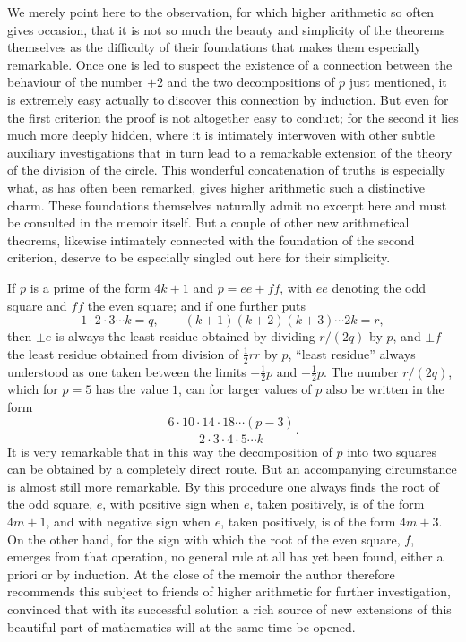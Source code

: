 \documentclass[12pt]{article}
\begin{document}
We merely point here to the observation, for which higher arithmetic so often gives occasion, that it is not so much the beauty and simplicity of the theorems themselves as the difficulty of their foundations that makes them especially remarkable. Once one is led to suspect the existence of a connection between the behaviour of the number $+2$ and the two decompositions of $p$ just mentioned, it is extremely easy actually to discover this connection by induction. But even for the first criterion the proof is not altogether easy to conduct; for the second it lies much more deeply hidden, where it is intimately interwoven with other subtle auxiliary investigations that in turn lead to a remarkable extension of the theory of the division of the circle. This wonderful concatenation of truths is especially what, as has often been remarked, gives higher arithmetic such a distinctive charm. These foundations themselves naturally admit no excerpt here and must be consulted in the memoir itself. But a couple of other new arithmetical theorems, likewise intimately connected with the foundation of the second criterion, deserve to be especially singled out here for their simplicity.

If $p$ is a prime of the form $4k+1$ and $p=ee+ff$, with $ee$ denoting the odd square and $ff$ the even square; and if one further puts
\[
1\cdot2\cdot3\cdots k=q,
\qquad
(k+1)(k+2)(k+3)\cdots2k=r,
\]
then $\pm e$ is always the least residue obtained by dividing $r/(2q)$ by $p$, and $\pm f$ the least residue obtained from division of $\frac12rr$ by $p$, ``least residue'' always understood as one taken between the limits $-\frac12p$ and $+\frac12p$. The number $r/(2q)$, which for $p=5$ has the value $1$, can for larger values of $p$ also be written in the form
\[
\frac{6\cdot10\cdot14\cdot18\cdots(p-3)}{2\cdot3\cdot4\cdot5\cdots k}.
\]
It is very remarkable that in this way the decomposition of $p$ into two squares can be obtained by a completely direct route. But an accompanying circumstance is almost still more remarkable. By this procedure one always finds the root of the odd square, $e$, with positive sign when $e$, taken positively, is of the form $4m+1$, and with negative sign when $e$, taken positively, is of the form $4m+3$. On the other hand, for the sign with which the root of the even square, $f$, emerges from that operation, no general rule at all has yet been found, either a priori or by induction. At the close of the memoir the author therefore recommends this subject to friends of higher arithmetic for further investigation, convinced that with its successful solution a rich source of new extensions of this beautiful part of mathematics will at the same time be opened.
\end{document}

